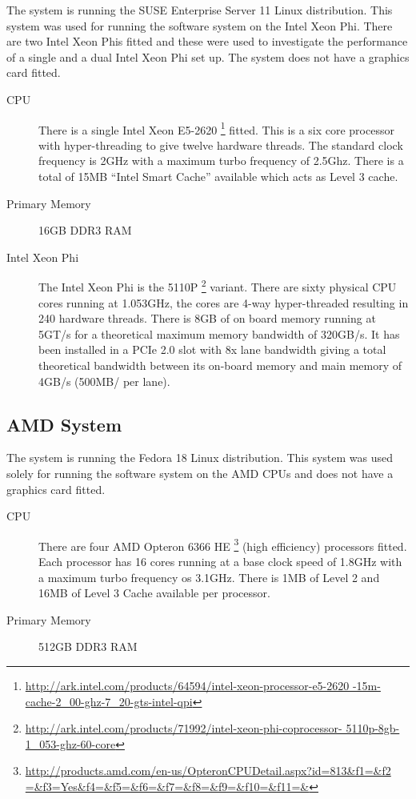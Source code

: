 The system is running the SUSE Enterprise Server 11 Linux distribution. This
system was used for running the software system on the Intel Xeon Phi. There are
two Intel Xeon Phis fitted and these were used to investigate the performance of
a single and a dual Intel Xeon Phi set up. The system does not have a graphics
card fitted.

\begin{description}

\item[CPU] There is a single Intel Xeon E5-2620
\footnote{\url{http://ark.intel.com/products/64594/intel-xeon-processor-e5-2620
-15m-cache-2_00-ghz-7_20-gts-intel-qpi}} fitted. This is a six core processor
with hyper-threading to give twelve hardware threads. The standard clock
frequency is 2GHz with a maximum turbo frequency of 2.5Ghz. There is a total of
15MB ``Intel Smart Cache'' available which acts as Level 3 cache.

\item[Primary Memory] 16GB DDR3 RAM

\item[Intel Xeon Phi] The Intel Xeon Phi is the 5110P
\footnote{\url{http://ark.intel.com/products/71992/intel-xeon-phi-coprocessor-
5110p-8gb-1_053-ghz-60-core}} variant. There are sixty physical CPU cores
running at 1.053GHz, the cores are 4-way hyper-threaded resulting in 240
hardware threads. There is 8GB of on board memory running at 5GT/s for a
theoretical maximum memory bandwidth of 320GB/s. It has been installed in a PCIe
2.0 slot with 8x lane bandwidth giving a total theoretical bandwidth between
its on-board memory and main memory of 4GB/s (500MB/ per lane).

\end{description}

\subsection{AMD System}

The system is running the Fedora 18 Linux distribution. This system was used
solely for running the software system on the AMD CPUs and does not have a
graphics card fitted.

\begin{description}

\item[CPU] There are four AMD Opteron 6366 HE
\footnote{\url{http://products.amd.com/en-us/OpteronCPUDetail.aspx?id=813&f1=&f2
=&f3=Yes&f4=&f5=&f6=&f7=&f8=&f9=&f10=&f11=&}} (high efficiency) processors
fitted. Each processor has 16 cores running at a base clock speed of 1.8GHz with
a maximum turbo frequency os 3.1GHz. There is 1MB of Level 2 and 16MB of Level 3
Cache available per processor.

\item[Primary Memory] 512GB DDR3 RAM

\end{description}


